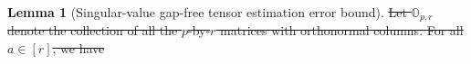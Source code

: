\documentclass[lettersize,onecolumn,journal]{IEEEtran}
\theoremstyle{definition}
\newtheorem{lem}{Lemma}
\theoremstyle{definition}
\newtheorem{condition}{Condition}
\newcommand{\of}[1]{\left(#1\right)}
\def\fixme#1#2{\textbf{\color{red}[FIXME (#1): #2]}}
\providecommand{\DIFdeltex}[1]{{\protect\color{red}\sout{#1}}}                      %
\providecommand{\DIFdel}[1]{\texorpdfstring{\DIFdeltex{#1}}{}} %
\begin{document}
\begin{lem}[Singular-value gap-free tensor estimation error bound]
\DIFdel{Let $\mathbb{O}_{p, r}$ denote the collection of all the $p$-by-$r$ matrices with orthonormal columns. For all $a \in [r]$, we have 
}%






\end{lem}
\end{document}
